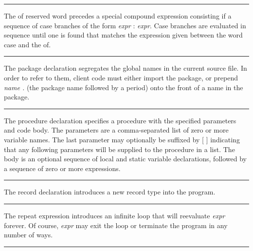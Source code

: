 \bigskip\hrule\vspace{0.1cm}

\noindent
{}The \textsf{of} reserved word precedes a special compound
expression consisting if a sequence of case branches of the form
\textit{expr} : \textit{expr}. Case branches are evaluated in sequence
until one is found that matches the expression given between the word
\textsf{case} and the \textsf{of}.

\bigskip\hrule\vspace{0.1cm}

\noindent
{}The \textsf{package} declaration segregates the global
names in the current source file. In order to refer to them, client
code must either import the package, or prepend \textsf{\textit{name
.}} (the package name followed by a period) onto the front of a name in
the package.

\bigskip\hrule\vspace{0.1cm}

\noindent
{}The \textsf{procedure} declaration specifies a
procedure with the specified parameters and code body. The parameters
are a comma-separated list of zero or more variable names. The last
parameter may optionally be suffixed by [ ] indicating that any
following parameters will be supplied to the procedure in a list. The
body is an optional sequence of local and static variable declarations,
followed by a sequence of zero or more expressions.

\bigskip\hrule\vspace{0.1cm}

\noindent
{}The \textsf{record} declaration introduces a new record
type into the program.

\bigskip\hrule\vspace{0.1cm}

\noindent
{}The \textsf{repeat} expression
introduces an infinite loop that will reevaluate \textit{expr} forever.
Of course, \textit{expr} may exit the loop or terminate the program in
any number of ways.

\bigskip\hrule\vspace{0.1cm}

